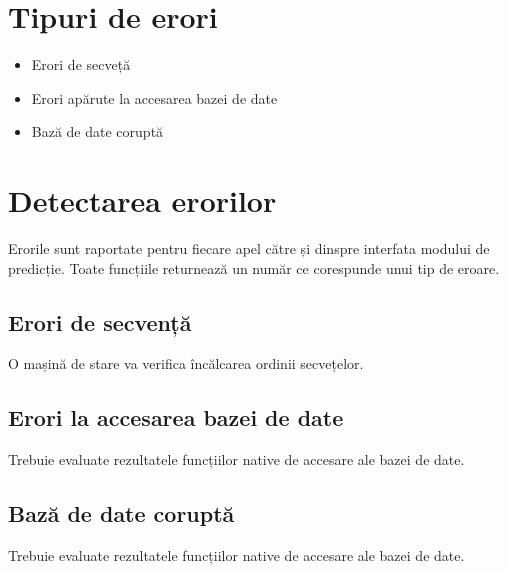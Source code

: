\label{cap6}


\label{Chapter6} %

\thispagestyle{fancy}


\section{Tipuri de erori} 
\begin{itemize}
 \setlength\itemsep{0em}
	\item Erori de secveță
	\item Erori apărute la accesarea bazei de date
	\item Bază de date coruptă
\end{itemize}


\section{Detectarea erorilor}
Erorile sunt raportate pentru fiecare apel către și dinspre interfata modului de predicție. Toate funcțiile returnează un număr ce corespunde unui tip de eroare.

	\subsection{Erori de secvență}
	O mașină de stare va verifica încălcarea ordinii secvețelor.
	
	\subsection{Erori la accesarea bazei de date}
	Trebuie evaluate rezultatele funcțiilor native de accesare ale bazei de date.

	\subsection{Bază de date coruptă}
	Trebuie evaluate rezultatele funcțiilor native de accesare ale bazei de date.
	
